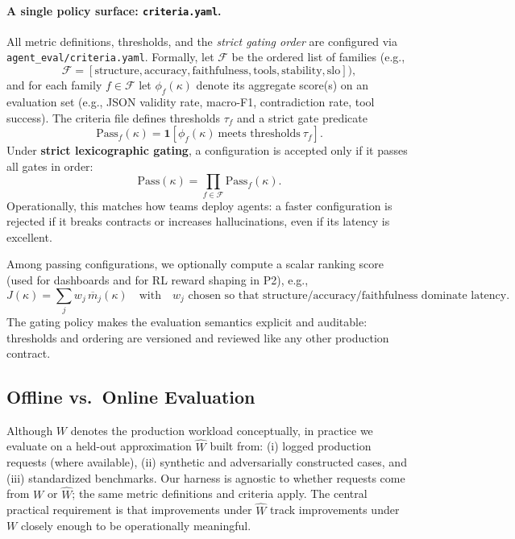 \documentclass[11pt]{article}
\begin{document}
\paragraph{A single policy surface: \texttt{criteria.yaml}.}
All metric definitions, thresholds, and the \emph{strict gating order} are configured via \texttt{agent\_eval/criteria.yaml}.
Formally, let $\mathcal{F}$ be the ordered list of families (e.g.,
\[
\mathcal{F}=[\text{structure},\text{accuracy},\text{faithfulness},\text{tools},\text{stability},\text{slo}]),
\]
and for each family $f\in\mathcal{F}$ let $\phi_f(\kappa)$ denote its aggregate score(s) on an evaluation set (e.g., JSON validity rate, macro-F1, contradiction rate, tool success).
The criteria file defines thresholds $\tau_f$ and a strict gate predicate
\[
\mathrm{Pass}_f(\kappa)=\mathbf{1}\!\left[\phi_f(\kappa)\ \text{meets thresholds}\ \tau_f\right].
\]
Under \textbf{strict lexicographic gating}, a configuration is accepted only if it passes all gates in order:
\[
\mathrm{Pass}(\kappa)=\prod_{f\in\mathcal{F}}\mathrm{Pass}_f(\kappa).
\]
Operationally, this matches how teams deploy agents: a faster configuration is rejected if it breaks contracts or increases hallucinations, even if its latency is excellent.

Among passing configurations, we optionally compute a scalar ranking score (used for dashboards and for RL reward shaping in P2), e.g.,
\[
J(\kappa)=\sum_{j} w_j \,\overline{m}_j(\kappa)
\quad\text{with}\quad w_j \text{ chosen so that structure/accuracy/faithfulness dominate latency.}
\]
The gating policy makes the evaluation semantics explicit and auditable: thresholds and ordering are versioned and reviewed like any other production contract.

\subsection{Offline vs.\ Online Evaluation}

Although $W$ denotes the production workload conceptually, in practice we evaluate on a held-out approximation $\widehat{W}$ built from:
(i) logged production requests (where available),
(ii) synthetic and adversarially constructed cases, and
(iii) standardized benchmarks.
Our harness is agnostic to whether requests come from $W$ or $\widehat{W}$; the same metric definitions and criteria apply.
The central practical requirement is that improvements under $\widehat{W}$ track improvements under $W$ closely enough to be operationally meaningful.
\end{document}
